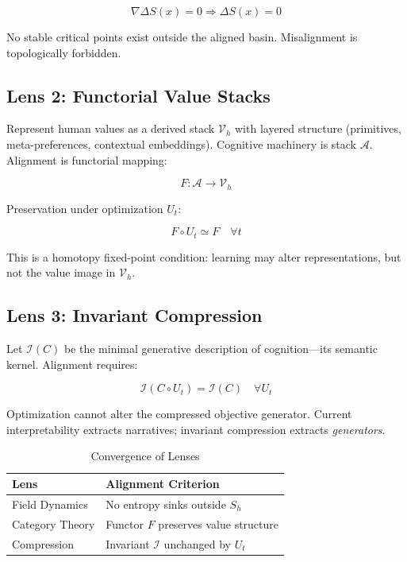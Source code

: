 \documentclass[11pt,a4paper]{article}
\theoremstyle{plain}
\theoremstyle{definition}
\numberwithin{equation}{section}
\begin{document}
\[
\nabla \Delta S(x) = 0 \Rightarrow \Delta S(x) = 0
\]

No stable critical points exist outside the aligned basin. Misalignment is topologically forbidden.

\subsection{Lens 2: Functorial Value Stacks}

Represent human values as a derived stack $\mathcal{V}_h$ with layered structure (primitives, meta-preferences, contextual embeddings). Cognitive machinery is stack $\mathcal{A}$. Alignment is functorial mapping:

\[
F: \mathcal{A} \to \mathcal{V}_h
\]

Preservation under optimization $U_t$:

\[
F \circ U_t \simeq F \quad \forall t
\]

This is a homotopy fixed-point condition: learning may alter representations, but not the value image in $\mathcal{V}_h$.

\subsection{Lens 3: Invariant Compression}

Let $\mathcal{I}(C)$ be the minimal generative description of cognition---its semantic kernel. Alignment requires:

\[
\mathcal{I}(C \circ U_t) = \mathcal{I}(C) \quad \forall U_t
\]

Optimization cannot alter the compressed objective generator. Current interpretability extracts narratives; invariant compression extracts \emph{generators}.

\begin{table}[H]
\centering
\caption{Convergence of Lenses}
\begin{tabular}{l l}
\toprule
\textbf{Lens} & \textbf{Alignment Criterion} \\
\midrule
Field Dynamics & No entropy sinks outside $S_h$ \\
Category Theory & Functor $F$ preserves value structure \\
Compression & Invariant $\mathcal{I}$ unchanged by $U_t$ \\
\bottomrule
\end{tabular}
\end{table}

\end{document}
